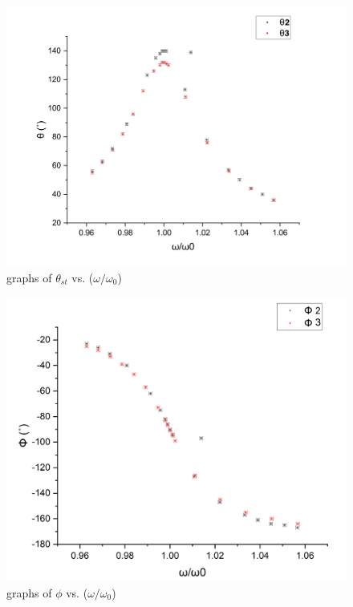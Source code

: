 \documentclass[12pt,a4paper]{article}
\begin{document}
\begin{figure}
    \centering 
\includegraphics[scale=0.5]{thetanew_new.png}
\caption{graphs of $\theta_{st}$ vs. ($\omega/\omega_0$) }
\end{figure}
\begin{figure}
    \centering
    \includegraphics[scale=0.5]{newnewphi.png}
    \caption{graphs of $\phi$ vs. ($\omega/\omega_0$) }
\end{figure}
\end{document}
